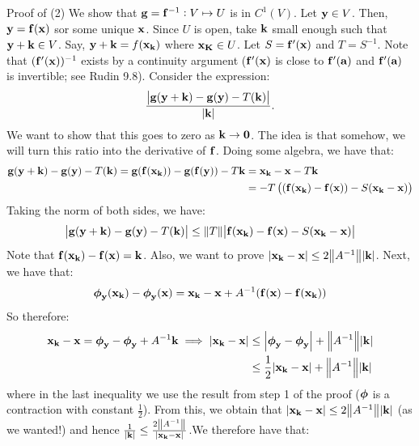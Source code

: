 \begin{nblank}{Proof of (2)}
    We show that $\mathbf{g} = \mathbf{f}^{-1}: V \mapsto U$ is in $C^1(V)$. Let $\mathbf{y} \in V$. Then, $\mathbf{y} = \mathbf{f}(\mathbf{x})$ sor some unique $\mathbf{x}$. Since $U$ is open, take $\mathbf{k}$ small enough such that $\mathbf{y} + \mathbf{k} \in V$. Say, $\mathbf{y} + \mathbf{k} = f(\mathbf{x}_{\mathbf{k}})$ where $\mathbf{x}_{\mathbf{K}} \in U$. Let $S = \mathbf{f}'(\mathbf{x})$ and $T = S^{-1}$. Note that $(\mathbf{f}'(\mathbf{x}))^{-1}$ exists by a continuity argument ($\mathbf{f}'(\mathbf{x})$ is close to $\mathbf{f}'(\mathbf{a})$ and $\mathbf{f}'(\mathbf{a})$ is invertible; see Rudin 9.8). Consider the expression:
    \begin{align*}
        \frac{\abs{\mathbf{g}(\mathbf{y} + \mathbf{k}) - \mathbf{g}(\mathbf{y}) - T(\mathbf{k})}}{\abs{\mathbf{k}}}.
    \end{align*}
    We want to show that this goes to zero as $\mathbf{k} \rightarrow \mathbf{0}$. The idea is that somehow, we will turn this ratio into the derivative of $\mathbf{f}$. Doing some algebra, we have that:
    \begin{align*}
        \mathbf{g}(\mathbf{y} + \mathbf{k}) - \mathbf{g}(\mathbf{y}) - T(\mathbf{k}) = \mathbf{g}(\mathbf{f}(\mathbf{x}_{\mathbf{k}})) - \mathbf{g}(\mathbf{f}(\mathbf{y})) - T\mathbf{k} &= \mathbf{x}_{\mathbf{k}} - \mathbf{x} - T\mathbf{k} 
        \\ &= -T\left((\mathbf{f}(\mathbf{x}_{\mathbf{k}}) - \mathbf{f}(\mathbf{x})) - S(\mathbf{x}_{\mathbf{k}} - \mathbf{x})\right)
    \end{align*}
    Taking the norm of both sides, we have:
    \begin{align*}
        \abs{\mathbf{g}(\mathbf{y} + \mathbf{k}) - \mathbf{g}(\mathbf{y}) - T(\mathbf{k})} \leq \norm{T}\abs{\mathbf{f}(\mathbf{x}_{\mathbf{k}}) - \mathbf{f}(\mathbf{x}) - S(\mathbf{x}_{\mathbf{k}} - \mathbf{x})}
    \end{align*}
    Note that $\mathbf{f}(\mathbf{x}_{\mathbf{k}}) - \mathbf{f}(\mathbf{x}) = \mathbf{k}$. Also, we want to prove $\abs{\mathbf{x}_{\mathbf{k}} - \mathbf{x}} \leq 2\norm{A^{-1}}\abs{\mathbf{k}}$. Next, we have that:
    \begin{align*}
        \mbox{\boldmath$ \phi $}_{\mathbf{y}}(\mathbf{x}_{\mathbf{k}}) - \mbox{\boldmath$ \phi $}_{\mathbf{y}}(\mathbf{x}) = \mathbf{x}_{\mathbf{k}} - \mathbf{x} + A^{-1}(\mathbf{f}(\mathbf{x}) - \mathbf{f}(\mathbf{x}_{\mathbf{k}}))
    \end{align*}
    So therefore:
    \begin{align*}
        \mathbf{x}_{\mathbf{k}} - \mathbf{x} = \mbox{\boldmath$ \phi $}_{\mathbf{y}} - \mbox{\boldmath$ \phi $}_{\mathbf{y}} + A^{-1}\mathbf{k} \implies \abs{\mathbf{x}_{\mathbf{k}} - \mathbf{x}} &\leq \abs{\mbox{\boldmath$ \phi $}_{\mathbf{y}} - \mbox{\boldmath$ \phi $}_{\mathbf{y}}} + \norm{A^{-1}}\abs{\mathbf{k}}
        \\ &\leq \frac{1}{2}\abs{\mathbf{x}_{\mathbf{k}} - \mathbf{x}} + \norm{A^{-1}}\abs{\mathbf{k}}
    \end{align*}
    where in the last inequality we use the result from step 1 of the proof ($\mbox{\boldmath$ \phi $}$ is a contraction with constant $\frac{1}{2}$). From this, we obtain that $\abs{\mathbf{x}_{\mathbf{k}} - \mathbf{x}} \leq 2\norm{A^{-1}}\abs{\mathbf{k}}$ (as we wanted!) and hence $\frac{1}{\abs{\mathbf{k}}} \leq \frac{2\norm{A^{-1}}}{\abs{\mathbf{x}_{\mathbf{k}} - \mathbf{x}}}$.We therefore have that:

\end{nblank}
